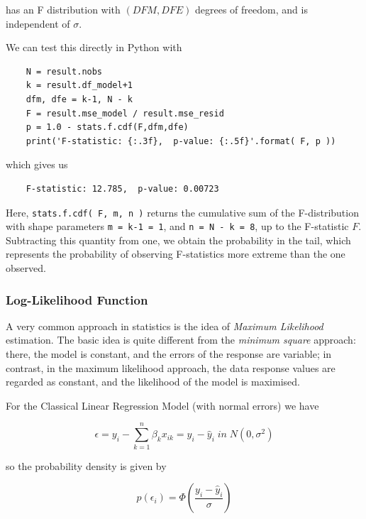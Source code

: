 has an F distribution with $(DFM, DFE)$ degrees of freedom, and is independent of $\sigma$.

We can test this directly in Python with

\begin{lstlisting}
    N = result.nobs
    k = result.df_model+1
    dfm, dfe = k-1, N - k
    F = result.mse_model / result.mse_resid
    p = 1.0 - stats.f.cdf(F,dfm,dfe)
    print('F-statistic: {:.3f},  p-value: {:.5f}'.format( F, p ))
\end{lstlisting}

which gives us

\begin{lstlisting}
    F-statistic: 12.785,  p-value: 0.00723
\end{lstlisting}

Here, \lstinline{stats.f.cdf( F, m, n )} returns the cumulative sum of the F-distribution with shape parameters \lstinline{m = k-1 = 1}, and \lstinline{n = N - k = 8}, up to the F-statistic $F$. Subtracting this quantity from one, we obtain the probability in the tail, which represents the probability of observing F-statistics more extreme than the one observed.

\subsubsection{Log-Likelihood Function}

A very common approach in statistics is the idea of \emph{Maximum Likelihood} estimation.  The basic idea is quite different from the \emph{minimum square} approach: there, the model is constant, and the errors of the response are variable; in contrast, in the maximum likelihood approach, the data response values are regarded as constant, and the likelihood of the model is maximised.

For the Classical Linear Regression Model (with normal errors) we have

\begin{equation}
  \epsilon = y_i - \sum_{k=1}^n \beta_k x_{ik} = y_i - \hat{y}_i \; in \; N(0, \sigma^2)
\end{equation}

so the probability density is given by

\begin{equation}
  p(\epsilon_i) =  \Phi (\frac{y_i - \hat{y}_i}{\sigma})
\end{equation}

